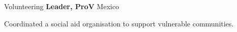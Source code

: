 \begin{rubric}{Volunteering}
\noentry{~}
\entry*[08/2018 -- 07/2020]
\textbf{Leader, ProV} \hfill Mexico\par
Coordinated a social aid organisation to support vulnerable communities.
\hfill \href{https://www.facebook.com/groups/782118565323194}{\faFacebook}

\end{rubric}

